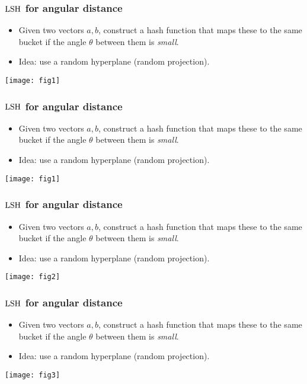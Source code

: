 \documentclass{beamer}
\begin{document}
\begin{frame}
\frametitle{$\mathrm{LSH}$ for angular distance}
\begin{itemize}
\item Given two vectors $a, b$, construct a hash function that maps these to the same bucket if the angle $\theta$ between them is {\em small}.
\item Idea: use a random hyperplane (random projection).
\end{itemize}
\begin{center}
\texttt{[image: fig1]}
\end{center}
\end{frame}

\begin{frame}
\frametitle{$\mathrm{LSH}$ for angular distance}
\begin{itemize}
\item Given two vectors $a, b$, construct a hash function that maps these to the same bucket if the angle $\theta$ between them is {\em small}.
\item Idea: use a random hyperplane (random projection).
\end{itemize}
\begin{center}
\texttt{[image: fig1]}
\end{center}
\end{frame}

\begin{frame}
\frametitle{$\mathrm{LSH}$ for angular distance}
\begin{itemize}
\item Given two vectors $a, b$, construct a hash function that maps these to the same bucket if the angle $\theta$ between them is {\em small}.
\item Idea: use a random hyperplane (random projection).
\end{itemize}
\begin{center}
\texttt{[image: fig2]}
\end{center}
\end{frame}

\begin{frame}
\frametitle{$\mathrm{LSH}$ for angular distance}
\begin{itemize}
\item Given two vectors $a, b$, construct a hash function that maps these to the same bucket if the angle $\theta$ between them is {\em small}.
\item Idea: use a random hyperplane (random projection).
\end{itemize}
\begin{center}
\texttt{[image: fig3]}
\end{center}
\end{frame}
\end{document}
